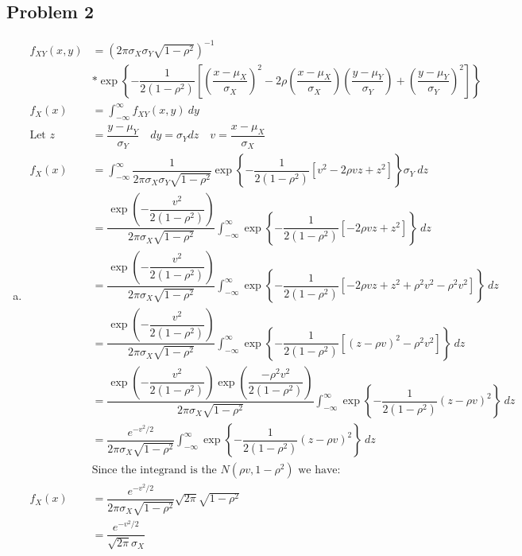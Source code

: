 \documentclass{article}
\begin{document}
\begin{flushleft}
\section*{Problem 2}
\begin{enumerate}[(a)]
\item 
\begin{align*}
f_{XY}(x,y)&=\left(2\pi \sigma_X \sigma_Y \sqrt{1-\rho^2} \right)^{-1}\\
&*\exp{\left\{-\dfrac{1}{2(1-\rho^2)}\left[\left(\dfrac{x-\mu_X}{\sigma_X} \right)^2- 2\rho \left(\dfrac{x-\mu_X}{\sigma_X} \right)\left(\dfrac{y-\mu_Y}{\sigma_Y} \right)+\left(\dfrac{y-\mu_Y}{\sigma_Y} \right)^2 \right] \right\}}\\
f_X(x)&=\int_{-\infty}^{\infty}f_{XY}(x,y) \ dy\\
\text{Let } z&=\dfrac{y-\mu_Y}{\sigma_Y} \quad dy=\sigma_Y dz \quad v=\dfrac{x-\mu_X}{\sigma_X}\\
f_X(x)&=\int_{-\infty}^{\infty}\dfrac{1}{2\pi \sigma_X \sigma_Y \sqrt{1-\rho^2}}\exp{\left\{-\dfrac{1}{2(1-\rho^2)}\left[v^2-2\rho vz+z^2  \right] \right\}}\sigma_Y \ dz\\
&=\dfrac{\exp{ \left(-\dfrac{v^2}{2(1-\rho^2)}\right)}}{2\pi \sigma_X \sqrt{1-\rho^2}}\int_{-\infty}^{\infty}\exp{\left\{-\dfrac{1}{2(1-\rho^2)}\left[-2\rho vz+z^2  \right] \right\}} \ dz\\
&=\dfrac{\exp{ \left(-\dfrac{v^2}{2(1-\rho^2)}\right)}}{2\pi \sigma_X \sqrt{1-\rho^2}}\int_{-\infty}^{\infty}\exp{\left\{-\dfrac{1}{2(1-\rho^2)}\left[-2\rho vz+z^2+\rho^2v^2-\rho^2v^2  \right] \right\}} \ dz\\
&=\dfrac{\exp{ \left(-\dfrac{v^2}{2(1-\rho^2)}\right)}}{2\pi \sigma_X \sqrt{1-\rho^2}}\int_{-\infty}^{\infty}\exp{\left\{-\dfrac{1}{2(1-\rho^2)}\left[(z-\rho v)^2-\rho^2 v^2 \right] \right\}} \ dz\\
&=\dfrac{\exp{ \left(-\dfrac{v^2}{2(1-\rho^2)}\right)}\exp{ \left(\dfrac{-\rho^2 v^2}{2(1-\rho^2)}\right)}}{2\pi \sigma_X \sqrt{1-\rho^2}}\int_{-\infty}^{\infty}\exp{\left\{-\dfrac{1}{2(1-\rho^2)}(z-\rho v)^2 \right\}} \ dz\\
&=\dfrac{e^{-v^2/2}}{2\pi \sigma_X \sqrt{1-\rho^2}}\int_{-\infty}^{\infty}\exp{\left\{-\dfrac{1}{2(1-\rho^2)}(z-\rho v)^2 \right\}} \ dz\\
&\text{Since the integrand is the } N(\rho v,1-\rho^2) \text{ we have:}\\
f_X(x)&=\dfrac{e^{-v^2/2}}{2\pi \sigma_X \sqrt{1-\rho^2}}\sqrt{2\pi}\sqrt{1-\rho^2}\\
&=\dfrac{e^{-v^2/2}}{\sqrt{2\pi} \sigma_X }\\

\end{align*}
\end{enumerate}
\end{flushleft}
\end{document}
